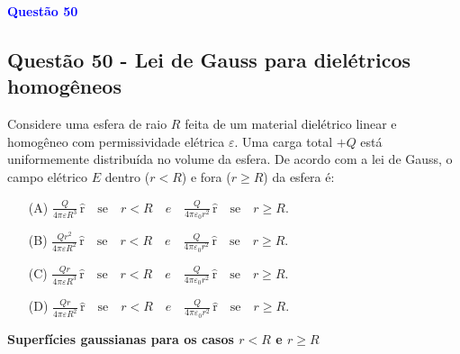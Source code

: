 \begin{flushleft}
\textbf{\textcolor{blue}{\Large Quest\~ao 50}}\\
\noindent
\subsection{Quest\~ao 50 - Lei de Gauss para dielétricos homogêneos}
Considere uma esfera de raio \( R \) feita de um material dielétrico linear e homogêneo com permissividade elétrica \( \varepsilon \).  
Uma carga total \( +Q \) está uniformemente distribuída no volume da esfera. De acordo com a lei de Gauss, o campo elétrico \( E \) 
dentro (\( r < R \)) e fora (\( r \geq R \)) da esfera é:


\begin{itemize}
\item[(A)] $\frac{Q}{4\pi\varepsilon R^3} \, \hat{\textrm{r}} \quad \text{se} \quad r < R \quad e \quad \frac{Q}{4\pi\varepsilon_0 r^2} \, \hat{\textrm{r}} \quad \text{se} \quad r \geq R. $
\item[(B)] $\frac{Q r^2}{4\pi\varepsilon R^2} \, \hat{\textrm{r}} \quad \text{se} \quad r < R \quad e \quad \frac{Q}{4\pi\varepsilon_0 r^2} \, \hat{\textrm{r}}  \quad \text{se} \quad r \geq R.$
\item[(C)] $\frac{Q r}{4\pi\varepsilon R^3} \, \hat{\textrm{r}} \quad \text{se} \quad r < R \quad e \quad \frac{Q}{4\pi\varepsilon_0 r^2} \, \hat{\textrm{r}} \quad \text{se} \quad r \geq R.$
\item[(D)] $\frac{Q r}{4\pi\varepsilon R^2} \, \hat{\textrm{r}} \quad \text{se} \quad r < R \quad e \quad \frac{Q}{4\pi\varepsilon_0 r^2} \, \hat{\textrm{r}} \quad \text{se} \quad r \geq R.$
\end{itemize}

\vspace{0.5cm}

\begin{center}
\textbf{Superfícies gaussianas para os casos \(r<R\) e \(r\geq R\)}
\end{center}

\begin{center}
\end{center}
\end{flushleft}

